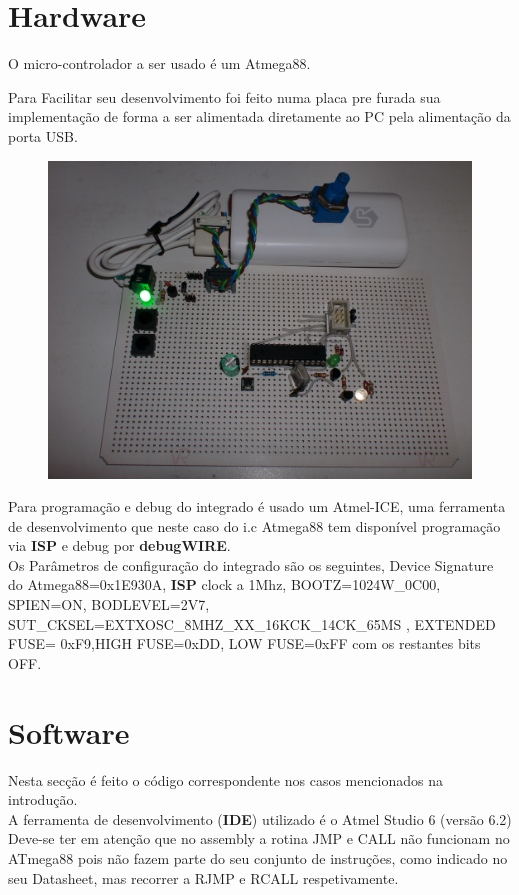 \documentclass[titlepage, a4paper, 10pt, reqno, openany]{report}
\begin{document}
	\section{Hardware}
O micro-controlador a ser usado \'{e} um Atmega88. \par
Para Facilitar seu desenvolvimento foi feito numa placa pre furada sua implementa\c{c}\~{a}o de forma a ser alimentada diretamente ao PC pela alimenta\c{c}\~{a}o da porta USB.
	\begin{figure}[H]
	\centering
	\includegraphics[scale=0.05]{./image/Board/DevBoard_1.JPG}
	\end{figure}
Para programa\c{c}\~{a}o e debug do integrado \'{e} usado um Atmel-ICE, uma ferramenta de desenvolvimento que neste caso do i.c Atmega88 tem dispon\'{i}vel programa\c{c}\~{a}o via {\bf ISP} e debug por {\bf debugWIRE}. \\
Os Par\^{a}metros de configura\c{c}\~{a}o do integrado s\~{a}o os seguintes, Device Signature do Atmega88=0x1E930A, {\bf ISP} clock a 1Mhz, BOOTZ=1024W\_0C00, SPIEN=ON, BODLEVEL=2V7, SUT\_CKSEL=EXTXOSC\_8MHZ\_XX\_16KCK\_14CK\_65MS , EXTENDED FUSE= 0xF9,HIGH FUSE=0xDD, LOW FUSE=0xFF com os restantes bits OFF.

	\section{Software}
Nesta sec\c{c}\~{a}o \'{e} feito o c\'{o}digo correspondente nos casos mencionados na introdu\c{c}\~{a}o. \\
A ferramenta de desenvolvimento ({\bf IDE}) utilizado \'{e} o Atmel Studio 6 (vers\~{a}o 6.2) \\
Deve-se ter em aten\c{c}\~{a}o que no assembly a rotina JMP e CALL n\~{a}o funcionam no ATmega88 pois n\~{a}o fazem parte do seu conjunto de instru\c{c}\~{o}es, como indicado no seu Datasheet, mas recorrer a RJMP e RCALL respetivamente.	
\end{document}
